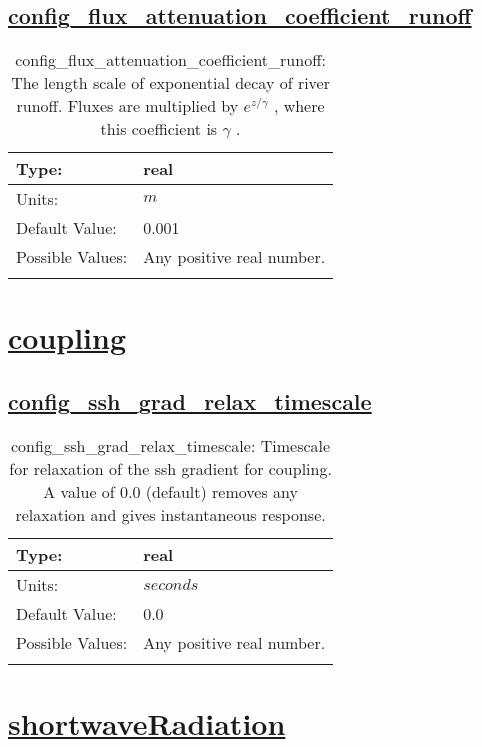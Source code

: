 \subsection[config\_flux\_attenuation\_coefficient\_runoff]{\hyperref[sec:nm_tab_forcing]{config\_flux\_attenuation\_coefficient\_runoff}}
\label{subsec:nm_sec_config_flux_attenuation_coefficient_runoff}
\begin{center}
\begin{longtable}{| p{2.0in} || p{4.0in} |}
    \hline
    Type: & real \\
    \hline
    Units: & $m$ \\
    \hline
    Default Value: & 0.001 \\
    \hline
    Possible Values: & Any positive real number. \\
    \hline
    \caption{config\_flux\_attenuation\_coefficient\_runoff:  The length scale of exponential decay of river runoff. Fluxes are multiplied by  $e^{z/\gamma}$ , where this coefficient is  $\gamma$ .}
\end{longtable}
\end{center}
\section[coupling]{\hyperref[sec:nm_tab_coupling]{coupling}}
\label{sec:nm_sec_coupling}
\subsection[config\_ssh\_grad\_relax\_timescale]{\hyperref[sec:nm_tab_coupling]{config\_ssh\_grad\_relax\_timescale}}
\label{subsec:nm_sec_config_ssh_grad_relax_timescale}
\begin{center}
\begin{longtable}{| p{2.0in} || p{4.0in} |}
    \hline
    Type: & real \\
    \hline
    Units: & $seconds$ \\
    \hline
    Default Value: & 0.0 \\
    \hline
    Possible Values: & Any positive real number. \\
    \hline
    \caption{config\_ssh\_grad\_relax\_timescale: Timescale for relaxation of the ssh gradient for coupling. A value of 0.0 (default) removes any relaxation and gives instantaneous response.}
\end{longtable}
\end{center}
\section[shortwaveRadiation]{\hyperref[sec:nm_tab_shortwaveRadiation]{shortwaveRadiation}}
\label{sec:nm_sec_shortwaveRadiation}
